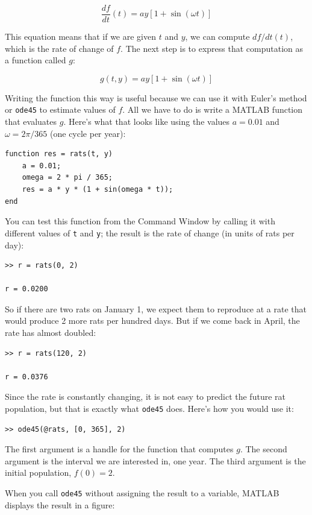 \documentclass{book}
\begin{document}
\[ \frac{df}{dt}(t) = a y \left[1 + \sin (\omega t) \right] \]

This equation means that if we are given $t$ and $y$, we can
compute $df/dt(t)$, which is the rate of change of $f$.
The next step is to express that computation as a function called
$g$:

\[ g(t, y) = a y \left[1 + \sin (\omega t) \right] \]

Writing the function this way is useful because we can use it 
with Euler's method
or {\tt ode45} to estimate values of $f$.  All we have to
do is write a MATLAB function that evaluates $g$.  Here's what
that looks like using the values $a = 0.01$
and $\omega = 2 \pi/365$ (one cycle per year):

\begin{verbatim}
function res = rats(t, y)
    a = 0.01;
    omega = 2 * pi / 365;
    res = a * y * (1 + sin(omega * t));
end
\end{verbatim}

You can test this function from the Command Window by calling it with
different values of {\tt t} and {\tt y}; the result is the rate of
change (in units of rats per day):

\begin{verbatim}
>> r = rats(0, 2)

r = 0.0200
\end{verbatim}

So if there are two rats on January 1, we expect them to reproduce
at a rate that would produce 2 more rats per hundred days. But
if we come back in April, the rate has almost doubled:

\begin{verbatim}
>> r = rats(120, 2)

r = 0.0376
\end{verbatim}

Since the rate is constantly changing, it is not easy to predict
the future rat population, but that is exactly what {\tt ode45} does.
Here's how you would use it:

\begin{verbatim}
>> ode45(@rats, [0, 365], 2)
\end{verbatim}

The first argument is a handle for the function that
computes $g$.  The second argument is the interval we are interested
in, one year.  The third argument is the initial population, $f(0) = 2$.

When you call {\tt ode45} without assigning the result to a variable,
MATLAB displays the result in a figure:
\end{document}
